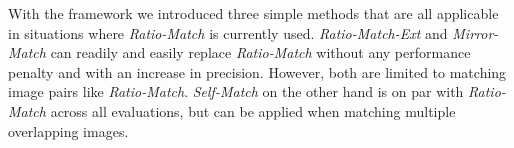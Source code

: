 \documentclass[10pt,journal,cspaper,compsoc]{IEEEtran}
\begin{document}
With the framework we introduced three simple methods that are all 
applicable in situations where \emph{Ratio-Match} is currently used.  
\emph{Ratio-Match-Ext} and \emph{Mirror-Match} 
can readily and easily replace \emph{Ratio-Match} without any performance penalty 
and with an increase in precision.  However, both are limited to matching 
image pairs like \emph{Ratio-Match}. \emph{Self-Match} on the other hand is on par with \emph{Ratio-Match} across all 
evaluations, but can be applied when matching multiple overlapping images. 


\balance


\end{document}
